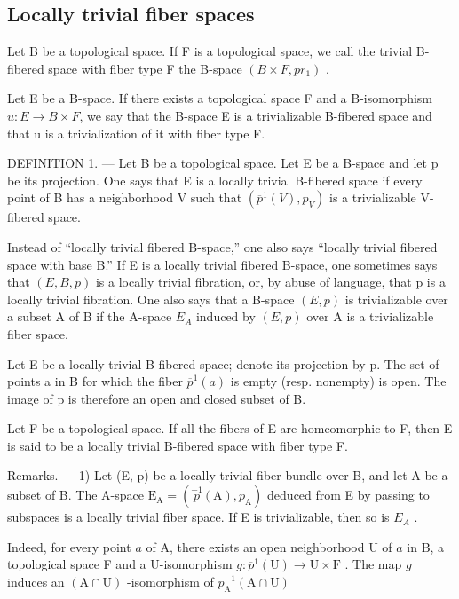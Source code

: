 \subsection{Locally trivial fiber spaces}

Let B be a topological space. If F is a topological space, we call the trivial B-fibered space with fiber type F the B-space \((B \times F, pr_{1})\) .

Let E be a B-space. If there exists a topological space F and a B-isomorphism \(u: E \rightarrow B \times F\), we say that the B-space E is a trivializable B-fibered space and that u is a trivialization of it with fiber type F.

DEFINITION 1. --- Let B be a topological space. Let E be a B-space and let p be its projection. One says that E is a locally trivial B-fibered space if every point of B has a neighborhood V such that \((\overline{p}^{1}(V), p_{V})\) is a trivializable V-fibered space.

Instead of “locally trivial fibered B-space,” one also says “locally trivial fibered space with base B.” If E is a locally trivial fibered B-space, one sometimes says that \((E,B,p)\) is a locally trivial fibration, or, by abuse of language, that p is a locally trivial fibration. One also says that a B-space \((E,p)\) is trivializable over a subset A of B if the A-space \(E_{A}\) induced by \((E,p)\) over A is a trivializable fiber space.

Let E be a locally trivial B-fibered space; denote its projection by p. The set of points a in B for which the fiber \(\overline{p}^{1}(a)\) is empty (resp. nonempty) is open. The image of p is therefore an open and closed subset of B.

Let F be a topological space. If all the fibers of E are homeomorphic to F, then E is said to be a locally trivial B-fibered space with fiber type F.

Remarks. --- 1) Let (E, p) be a locally trivial fiber bundle over B, and let A be a subset of B. The A-space \(\mathrm{E}_{\mathrm{A}} = (\stackrel{-1}{p}(\mathrm{A}), p_{\mathrm{A}})\) deduced from E by passing to subspaces is a locally trivial fiber space. If E is trivializable, then so is \(E_{A}\) .

Indeed, for every point \(a\) of A, there exists an open neighborhood U of \(a\) in B, a topological space F and a U-isomorphism \(g\colon \overline{p}^{1}(\mathrm{U})\to \mathrm{U}\times \mathrm{F}\) . The map \(g\) induces an \((\mathrm{A}\cap \mathrm{U})\) -isomorphism of \(\overline{p}_{\mathrm{A}}^{-1}(\mathrm{A}\cap \mathrm{U})\)


